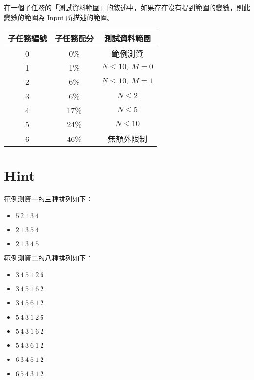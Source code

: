 \documentclass[11pt,a4paper]{article}
\begin{document}
在一個子任務的「測試資料範圍」的敘述中，如果存在沒有提到範圍的變數，則此變數的範圍為 Input 所描述的範圍。

\begin{center}
 \begin{tabular}{||c c c||} 
 \hline
 子任務編號 & 子任務配分 & 測試資料範圍 \\  
 \hline\hline
 0 & 0\% & 範例測資 \\ 
 \hline
 1 & 1\% & $N \le 10,\ M = 0$ \\
 \hline
 2 & 6\% & $N \le 10,\ M = 1$ \\
 \hline
 3 & 6\% & $N \le 2$ \\
 \hline
 4 & 17\% & $N \le 5$ \\
 \hline
 5 & 24\% & $N \le 10$ \\
 \hline
 6 & 46\% & 無額外限制 \\ 
 \hline
\end{tabular}
\end{center}

\section*{Hint}
範例測資一的三種排列如下：
\begin{itemize}
	\item $5\ 2\ 1\ 3\ 4$
	\item $2\ 1\ 3\ 5\ 4$
	\item $2\ 1\ 3\ 4\ 5$
\end{itemize}

範例測資二的八種排列如下：
\begin{itemize}
	\item $3\ 4\ 5\ 1\ 2\ 6$
	\item $3\ 4\ 5\ 1\ 6\ 2$
	\item $3\ 4\ 5\ 6\ 1\ 2$
	\item $5\ 4\ 3\ 1\ 2\ 6$
	\item $5\ 4\ 3\ 1\ 6\ 2$
	\item $5\ 4\ 3\ 6\ 1\ 2$
	\item $6\ 3\ 4\ 5\ 1\ 2$
	\item $6\ 5\ 4\ 3\ 1\ 2$
\end{itemize}
\end{document}
